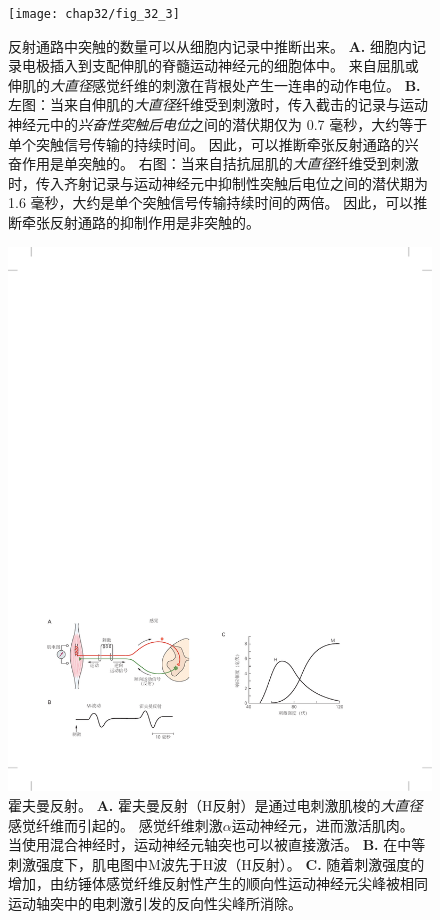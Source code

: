 \begin{figure}[htbp]
	\centering
	\texttt{[image: chap32/fig\_32\_3]}
	\caption{反射通路中突触的数量可以从细胞内记录中推断出来。
		\textbf{A.} 细胞内记录电极插入到支配伸肌的脊髓运动神经元的细胞体中。
		来自屈肌或伸肌的\textit{大直径}感觉纤维的刺激在背根处产生一连串的动作电位。
		\textbf{B.} 左图：当来自伸肌的\textit{大直径}纤维受到刺激时，传入截击的记录与运动神经元中的\textit{兴奋性突触后电位}之间的潜伏期仅为 0.7 毫秒，大约等于单个突触信号传输的持续时间。
		因此，可以推断牵张反射通路的兴奋作用是单突触的。
		右图：当来自拮抗屈肌的\textit{大直径}纤维受到刺激时，传入齐射记录与运动神经元中抑制性突触后电位之间的潜伏期为 1.6 毫秒，大约是单个突触信号传输持续时间的两倍。
		因此，可以推断牵张反射通路的抑制作用是非突触的。}
	\label{fig:32_3}
\end{figure}



\begin{figure}[htbp]
	\centering
	\includegraphics[width=1.0\linewidth]{chap32/fig_32_4}
	\caption{霍夫曼反射。
		\textbf{A.} 霍夫曼反射（H反射）是通过电刺激肌梭的\textit{大直径}感觉纤维而引起的。
		感觉纤维刺激$\alpha$运动神经元，进而激活肌肉。
		当使用混合神经时，运动神经元轴突也可以被直接激活。
		\textbf{B.} 在中等刺激强度下，肌电图中M波先于H波（H反射）。
		\textbf{C.} 随着刺激强度的增加，由纺锤体感觉纤维反射性产生的顺向性运动神经元尖峰被相同运动轴突中的电刺激引发的反向性尖峰所消除。}
	\label{fig:32_4}
\end{figure}


